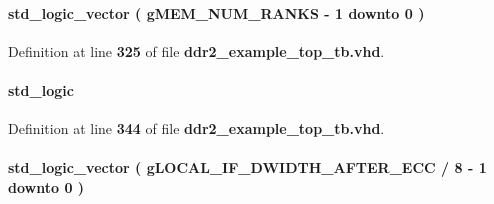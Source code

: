 \paragraph[{odt\+\_\+delayed}]{ {\bfseries \textcolor{comment}{std\+\_\+logic\+\_\+vector}\textcolor{vhdlchar}{ }\textcolor{vhdlchar}{(}\textcolor{vhdlchar}{ }\textcolor{vhdlchar}{ }\textcolor{vhdlchar}{ }\textcolor{vhdlchar}{ }{\bfseries {\bf g\+M\+E\+M\+\_\+\+N\+U\+M\+\_\+\+R\+A\+N\+KS}} \textcolor{vhdlchar}{-\/}\textcolor{vhdlchar}{ } \textcolor{vhdldigit}{1} \textcolor{vhdlchar}{ }\textcolor{keywordflow}{downto}\textcolor{vhdlchar}{ }\textcolor{vhdlchar}{ } \textcolor{vhdldigit}{0} \textcolor{vhdlchar}{ }\textcolor{vhdlchar}{)}\textcolor{vhdlchar}{ }} \hspace{0.3cm}{\ttfamily [Signal]}}\label{classddr2__example__top__tb_1_1rtl_a6a0c9222a1f4ef3790482a077f9be984}


Definition at line {\bf 325} of file {\bf ddr2\+\_\+example\+\_\+top\+\_\+tb.\+vhd}.

\paragraph[{pnf}]{ {\bfseries \textcolor{comment}{std\+\_\+logic}\textcolor{vhdlchar}{ }} \hspace{0.3cm}{\ttfamily [Signal]}}\label{classddr2__example__top__tb_1_1rtl_a774de4229ea968c4ed1114561cfa8216}


Definition at line {\bf 344} of file {\bf ddr2\+\_\+example\+\_\+top\+\_\+tb.\+vhd}.

\paragraph[{pnf\+\_\+per\+\_\+byte}]{ {\bfseries \textcolor{comment}{std\+\_\+logic\+\_\+vector}\textcolor{vhdlchar}{ }\textcolor{vhdlchar}{(}\textcolor{vhdlchar}{ }\textcolor{vhdlchar}{ }\textcolor{vhdlchar}{ }\textcolor{vhdlchar}{ }{\bfseries {\bf g\+L\+O\+C\+A\+L\+\_\+\+I\+F\+\_\+\+D\+W\+I\+D\+T\+H\+\_\+\+A\+F\+T\+E\+R\+\_\+\+E\+CC}} \textcolor{vhdlchar}{/}\textcolor{vhdlchar}{ } \textcolor{vhdldigit}{8} \textcolor{vhdlchar}{-\/}\textcolor{vhdlchar}{ } \textcolor{vhdldigit}{1} \textcolor{vhdlchar}{ }\textcolor{keywordflow}{downto}\textcolor{vhdlchar}{ }\textcolor{vhdlchar}{ } \textcolor{vhdldigit}{0} \textcolor{vhdlchar}{ }\textcolor{vhdlchar}{)}\textcolor{vhdlchar}{ }} \hspace{0.3cm}{\ttfamily [Signal]}}\label{classddr2__example__top__tb_1_1rtl_a4b132940d29003d427e41cc1b10caf5c}


